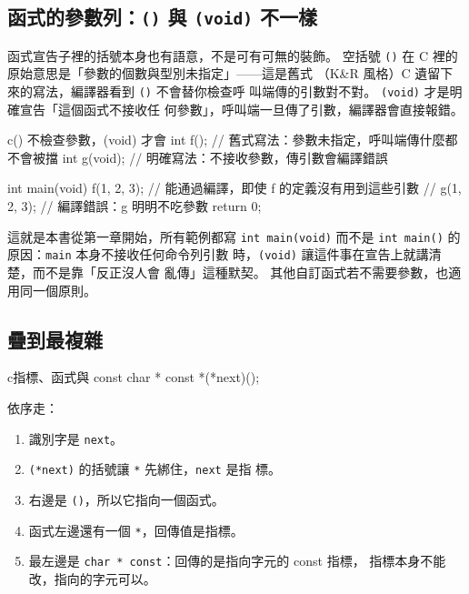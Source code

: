 \subsection[參數列：() 與 (void) 不一樣]{函式的參數列：\texttt{()} 與 \texttt{(void)} 不一樣}

函式宣告子裡的括號本身也有語意，不是可有可無的裝飾。 空括號
\texttt{()} 在 C 裡的原始意思是「參數的個數與型別未指定」——這是舊式
（K\&R 風格）C 遺留下來的寫法，編譯器看到 \texttt{()} 不會替你檢查呼
叫端傳的引數對不對。 \texttt{(void)} 才是明確宣告「這個函式不接收任
何參數」，呼叫端一旦傳了引數，編譯器會直接報錯。

\begin{code}{c}{() 不檢查參數，(void) 才會}
int f();       // 舊式寫法：參數未指定，呼叫端傳什麼都不會被擋
int g(void);   // 明確寫法：不接收參數，傳引數會編譯錯誤

int main(void) {
    f(1, 2, 3);   // 能通過編譯，即使 f 的定義沒有用到這些引數
    // g(1, 2, 3);  // 編譯錯誤：g 明明不吃參數
    return 0;
}
\end{code}

這就是本書從第一章開始，所有範例都寫 \texttt{int main(void)} 而不是
\texttt{int main()} 的原因：\texttt{main} 本身不接收任何命令列引數
時，\texttt{(void)} 讓這件事在宣告上就講清楚，而不是靠「反正沒人會
亂傳」這種默契。 其他自訂函式若不需要參數，也適用同一個原則。


\subsection{疊到最複雜}

\begin{code}{c}{指標、函式與 const}
char * const *(*next)();
\end{code}

依序走：

\begin{enumerate}
\item 識別字是 \texttt{next}。
\item \texttt{(*next)} 的括號讓 \texttt{*} 先綁住，\texttt{next} 是指
標。
\item 右邊是 \texttt{()}，所以它指向一個函式。
\item 函式左邊還有一個 \texttt{*}，回傳值是指標。
\item 最左邊是 \texttt{char * const}：回傳的是指向字元的 const 指標，
指標本身不能改，指向的字元可以。
\end{enumerate}

